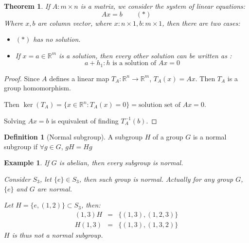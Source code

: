 \documentclass{article}
\theoremstyle{MyNonumberplain}
\theoremstyle{break}
\newtheorem*{proof}{Proof. }
\theoremstyle{break}
\newtheorem{theorem}{Theorem}[section]
\newtheorem{example}{Example}[section]
\theoremstyle{break}
\theoremstyle{definition}
\theoremstyle{break}
\newtheorem{definition}{Definition}[section]
\begin{document}
\begin{thmbox}
    \begin{theorem}
        If $A : m \times n$ is a matrix, we consider the system of linear equations:
        \[ A x = b \qquad (\ast) \]
        Where $x, b$ are column vector, where $x : n \times 1, b : m \times 1$, then
        there are two cases:\bigskip
        \begin{itemize}
        \item $(\ast)$ has no solution.\bigskip
        
        \item If $x = a \in \mathbb{R}^m$ is a solution, then every other solution
        can be written as :
        \[ a + h_1 : h \text{ is a solution of $A x = 0$} \]
        \end{itemize}
    \end{theorem}
    \begin{prfbox}
        \begin{proof}
            Since $A$ defines a linear map $T_A : \mathbb{R}^n \rightarrow
            \mathbb{R}^m$, $T_A (x) = A x$. Then $T_A$ is a group homomorphism.\bigskip

            Then $\ker (T_A) = \{ x \in \mathbb{R}^n : T_A (x) = 0 \} = \text{solution set
            of $A x = 0$}$.\bigskip

            Solving $A x = b$ is equivalent of finding $T^{- 1}_A (b)$. 
        \end{proof}
    \end{prfbox}
\end{thmbox}

\begin{defbox}
    \begin{definition}[Normal subgroup]
        A subgroup $H$ of a group $G$ is a normal subgroup if $\forall g \in G$, $g H = H g$
    \end{definition}
\end{defbox}

\begin{expbox}
    \begin{example}
        If $G$ is abelian, then every subgroup is normal.\bigskip

        Consider $S_3$, let $\{ e \} \in S_3$, then such group is normal. Actually
        for any group $G$, $\{ e \}$ and $G$ are normal.\bigskip

        Let $H = \{ e, (1, 2) \} \subset S_3$, then:
        \begin{eqnarray*}
        (1, 3) H & = & \{ (1, 3), (1, 2, 3) \}\\
        H (1, 3) & = & \{ (1, 3), (1, 3, 2) \}
        \end{eqnarray*}
        $H$ is thus not a normal subgroup.
    \end{example}
\end{expbox}
\end{document}
